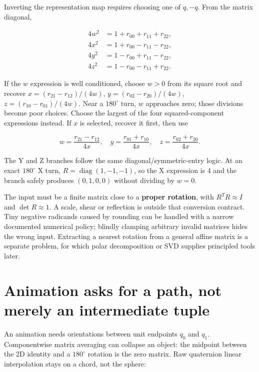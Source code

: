 \hypertarget{01-foundations-i-ch019-recover-a-large-component-instead-of-dividing-by-a-nearly-zero-one}{}

Inverting the representation map requires choosing one of \(q,-q\). From the matrix diagonal,

\[
\begin{aligned}
4w^2&=1+r_{00}+r_{11}+r_{22},\\
4x^2&=1+r_{00}-r_{11}-r_{22},\\
4y^2&=1-r_{00}+r_{11}-r_{22},\\
4z^2&=1-r_{00}-r_{11}+r_{22}.
\end{aligned}
\]

If the \(w\) expression is well conditioned, choose \(w>0\) from its square root and recover \(x=(r_{21}-r_{12})/(4w)\), \(y=(r_{02}-r_{20})/(4w)\), \(z=(r_{10}-r_{01})/(4w)\). Near a \(180^\circ\) turn, \(w\) approaches zero; those divisions become poor choices. Choose the largest of the four squared-component expressions instead. If \(x\) is selected, recover it first, then use

\[
w=\frac{r_{21}-r_{12}}{4x},\quad
y=\frac{r_{01}+r_{10}}{4x},\quad
z=\frac{r_{02}+r_{20}}{4x}.
\]

The Y and Z branches follow the same diagonal/symmetric-entry logic. At an exact \(180^\circ\) X turn, \(R=\operatorname{diag}(1,-1,-1)\), so the X expression is \(4\) and the branch safely produces \((0,1,0,0)\) without dividing by \(w=0\).

The input must be a finite matrix close to a \textbf{proper rotation}, with \(R^TR\approx I\) and \(\det R\approx1\). A scale, shear or reflection is outside that conversion contract. Tiny negative radicands caused by rounding can be handled with a narrow documented numerical policy; blindly clamping arbitrary invalid matrices hides the wrong input. Extracting a nearest rotation from a general affine matrix is a separate problem, for which polar decomposition or SVD supplies principled tools later.

\section{Animation asks for a path, not merely an intermediate tuple}\label{01-foundations-i-ch019-animation-asks-for-a-path-not-merely-an-intermediate-tuple}

\hypertarget{01-foundations-i-ch019-animation-asks-for-a-path-not-merely-an-intermediate-tuple}{}

An animation needs orientations between unit endpoints \(q_0\) and \(q_1\). Componentwise matrix averaging can collapse an object: the midpoint between the 2D identity and a \(180^\circ\) rotation is the zero matrix. Raw quaternion linear interpolation stays on a chord, not the sphere:


